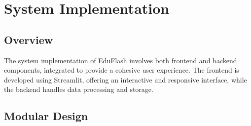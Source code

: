 \documentclass{report}
\begin{document}
\chapter{System Implementation}
\section{Overview}
The system implementation of EduFlash involves both frontend and backend components, integrated to provide a cohesive user experience. The frontend is developed using Streamlit, offering an interactive and responsive interface, while the backend handles data processing and storage.

\section{Modular Design}

\end{document}
